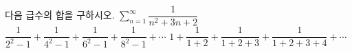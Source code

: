 다음 급수의 합을 구하시오.
 $\displaystyle\sum_{n=1}^{\infty}\dfrac{1}{n^2+3n+2}$
 $\dfrac{1}{2^2-1}+\dfrac{1}{4^2-1}+\dfrac{1}{6^2-1}+\dfrac{1}{8^2-1}+\cdots$
 $1+\dfrac{1}{1+2}+\dfrac{1}{1+2+3}+\dfrac{1}{1+2+3+4}+\cdots$
